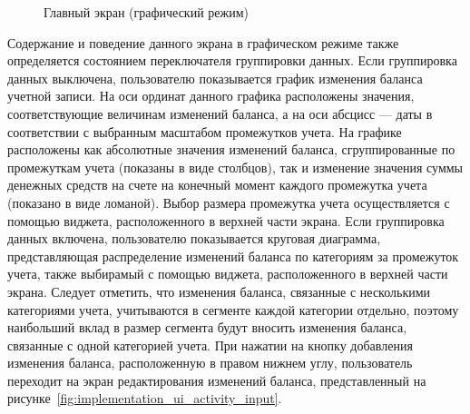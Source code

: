 \begin{figure}[h!]
  \centering
  \caption{Главный экран (графический режим)}
  \label{fig:implementation_ui_activity_balance_graphic}
\end{figure}

Содержание и поведение данного экрана в графическом режиме также
определяется состоянием переключателя группировки данных.
Если группировка данных выключена,
пользователю показывается график изменения баланса учетной записи.
На оси ординат данного графика расположены значения,
соответствующие величинам изменений баланса, а на оси абсцисс ---
даты в соответствии с выбранным масштабом промежутков учета.
На графике расположены как абсолютные значения изменений баланса,
сгруппированные по промежуткам учета (показаны в виде столбцов),
так и изменение значения суммы денежных средств на счете
на конечный момент каждого промежутка учета (показано в виде ломаной).
Выбор размера промежутка учета осуществляется с помощью виджета,
расположенного в верхней части экрана.
Если группировка данных включена, пользователю показывается
круговая диаграмма, представляющая распределение изменений баланса
по категориям за промежуток учета, также выбирамый с помощью виджета,
расположенного в верхней части экрана.
Следует отметить, что изменения баланса, связанные с несколькими
категориями учета, учитываются в сегменте каждой категории отдельно,
поэтому наибольший вклад в размер сегмента будут вносить изменения
баланса, связанные с одной категорией учета.
При нажатии на кнопку добавления изменения баланса,
расположенную в правом нижнем углу,
пользователь переходит на экран редактирования изменений баланса,
представленный на рисунке~\ref{fig:implementation_ui_activity_input}.

